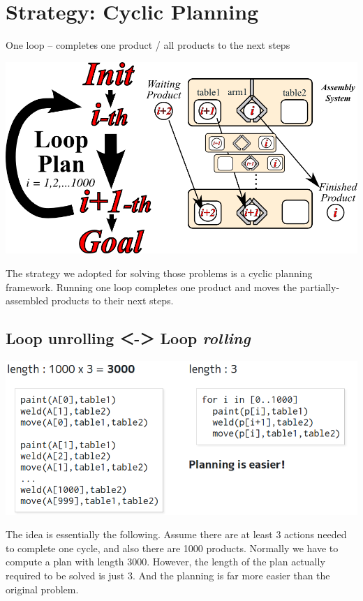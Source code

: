 \section{Strategy: Cyclic Planning}
\label{sec-4}

One loop -- completes one product / all products to the next steps

\includegraphics[width=\textwidth]{img/cyclic-planning.png}

\begin{resume}
The strategy we adopted for solving those problems
is a cyclic planning framework.
Running one loop completes one product and
moves the partially-assembled products to their next steps.
\end{resume}

\subsection{Loop unrolling ＜-＞ Loop \emph{rolling}}
\label{sec-4-1}
\includegraphics[width=\textwidth]{img/static/python-loop.png}

\begin{resume}
The idea is essentially the following.
Assume there are at least 3 actions needed to complete one cycle,
and also there are 1000 products.
Normally we have to compute a plan with length 3000.
However, the length of the plan actually required to be solved is just 3.
And the planning is far more easier than the original problem.
\end{resume}


